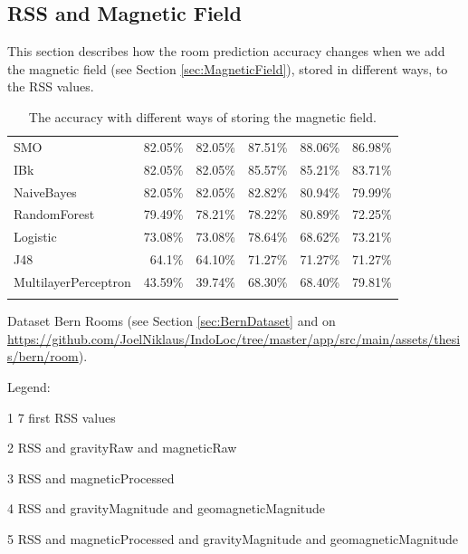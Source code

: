 




\subsection{RSS and Magnetic Field}

This section describes how the room prediction accuracy changes when we add the magnetic field (see Section \ref{sec:MagneticField}), stored in different ways, to the RSS values. 

\begin{table}[H]
	\begin{threeparttable}
		\caption{The accuracy with different ways of storing the magnetic field.}
		\label{tab:RSSAndMagnetic}
		\centering
		\begin{tabular}{l r r r r r}
		\toprule
		\tabhead{Classifier} & \tabhead{1} & \tabhead{2} & \tabhead{3} & \tabhead{4} & \tabhead{5} \\
		\midrule
		
SMO &	82.05\%	&	82.05\%	&	87.51\%	&	88.06\%	&	86.98\% \\IBk	& 82.05\%	&	82.05\%	&	85.57\%	&	85.21\%	&	83.71\% \\NaiveBayes	&	82.05\%	&	82.05\%	&	82.82\%	&	80.94\%	&	79.99\% \\RandomForest	&	79.49\%	&	78.21\%	&	78.22\%	&	80.89\%	&	72.25\% \\Logistic	&	73.08\%	&	73.08\%	&	78.64\%	&	68.62\%	&	73.21\% \\J48	&	64.1\%	&	64.10\%	&	71.27\%	&	71.27\%	&	71.27\% \\MultilayerPerceptron	&	43.59\%	&	39.74\%	&	68.30\%	&	68.40\%	&	79.81\% \\
		
		\bottomrule\\
		\end{tabular}
	\begin{tablenotes}
      \small
      \item Dataset Bern Rooms (see Section \ref{sec:BernDataset} and on \url{https://github.com/JoelNiklaus/IndoLoc/tree/master/app/src/main/assets/thesis/bern/room}).
        \item Legend:
\item[1] 7 first RSS values
\item[2] RSS and gravityRaw and magneticRaw
\item[3] RSS and magneticProcessed
\item[4] RSS and gravityMagnitude and geomagneticMagnitude
\item[5] RSS and magneticProcessed and gravityMagnitude and geomagneticMagnitude
      
    \end{tablenotes}
	\end{threeparttable}
\end{table} 

